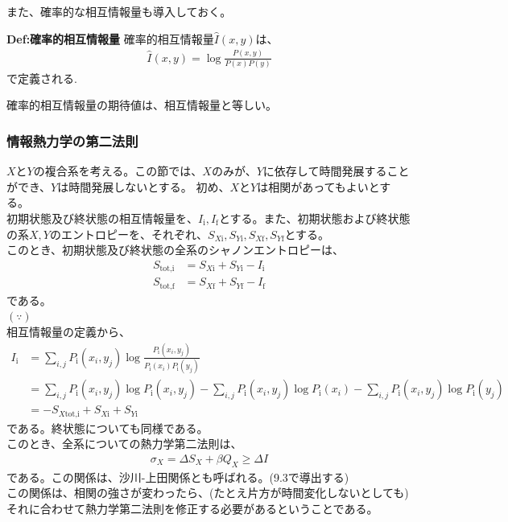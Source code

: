 \documentclass[a4paper,11pt]{jsarticle}
\numberwithin{equation}{section}
\begin{document}
また、確率的な相互情報量も導入しておく。
\begin{itembox}[l]{\textbf{Def:確率的相互情報量}}
        確率的相互情報量$\hat{I}(x,y)$は、
        \begin{align}
                \hat{I}(x,y) = \log\frac{P(x,y)}{P(x)P(y)}
        \end{align}
        で定義される.

\end{itembox}
確率的相互情報量の期待値は、相互情報量と等しい。\\

\subsubsection{情報熱力学の第二法則}
$X$と$Y$の複合系を考える。この節では、$X$のみが、$Y$に依存して時間発展することができ、$Y$は時間発展しないとする。
初め、$X$と$Y$は相関があってもよいとする。\\
初期状態及び終状態の相互情報量を、$I_{\text{i}},I_{\text{f}}$とする。また、初期状態および終状態の系$X,Y$のエントロピーを、それぞれ、$S_{X\text{i}},S_{Y\text{i}},S_{X\text{f}},S_{Y\text{f}}$とする。\\
このとき、初期状態及び終状態の全系のシャノンエントロピーは、
\begin{align}
    S_{\text{tot,i}} &= S_{X\text{i}} + S_{Y\text{i}} - I_{\text{i}} \\
    S_{\text{tot,f}} &= S_{X\text{f}} + S_{Y\text{f}} - I_{\text{f}}
\end{align}
である。\\
$(\because)$\\
相互情報量の定義から、
\begin{align}
    I_{\text{i}} &= \sum_{i,j}P_{\text{i}}(x_i,y_j)\log\frac{P_{\text{i}}(x_i,y_j)}{P_{\text{i}}(x_i)P_{\text{i}}(y_j)} \\
    &= \sum_{i,j}P_{\text{i}}(x_i,y_j)\log P_{\text{i}}(x_i,y_j) - \sum_{i,j}P_{\text{i}}(x_i,y_j)\log P_{\text{i}}(x_i) - \sum_{i,j}P_{\text{i}}(x_i,y_j)\log P_{\text{i}}(y_j) \\
    &= -S_{X\text{tot,i}}  + S_{X\text{i}} + S_{Y\text{i}}
\end{align}
である。終状態についても同様である。\hfill\qedsymbol\\


このとき、全系についての熱力学第二法則は、
\begin{align}
    \sigma_X = \Delta S_X +\beta Q_X \geq \Delta I
\end{align}
である。この関係は、沙川-上田関係とも呼ばれる。(9.3で導出する)\\
この関係は、相関の強さが変わったら、(たとえ片方が時間変化しないとしても)それに合わせて熱力学第二法則を修正する必要があるということである。\\
\end{document}
